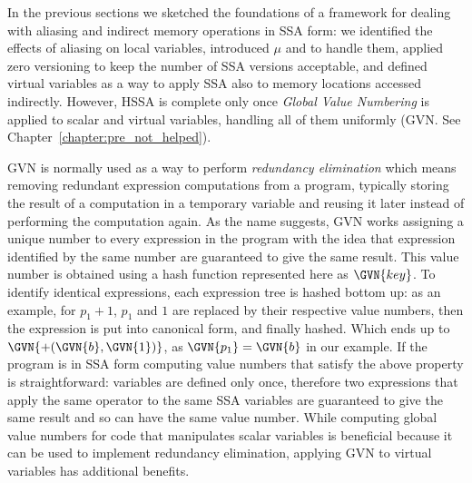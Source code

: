 In the previous sections we sketched the foundations of a framework for dealing with aliasing and indirect memory operations in SSA form: we identified the effects of aliasing on local variables, introduced $\mu$ and \chiops to handle them, applied zero versioning to keep the number of SSA versions acceptable, and defined virtual variables as a way to apply SSA also to memory locations accessed indirectly. However, HSSA is complete only once {\em Global Value Numbering} is applied to scalar and virtual variables, handling all of them uniformly (GVN. See Chapter~\ref{chapter:pre_not_helped}).

GVN is normally used as a way to perform \emph{redundancy elimination} which means removing redundant expression computations from a program, typically storing the result of a computation in a temporary variable and reusing it later instead of performing the computation again.
As the name suggests, GVN works assigning a unique number to every expression in the program with the idea that expression identified by the same number are guaranteed to give the same result.
This value number is obtained using a hash function represented here as $\GVN{key}$.
To identify identical expressions, each expression tree is hashed bottom up: as an example, for $p_1+1$, $p_1$ and $1$ are replaced by their respective value numbers, then the expression is put into canonical form, and finally hashed. Which ends up to $\GVN{+(\GVN{b},\GVN{1})}$, as $\GVN{p_1}=\GVN{b}$ in our example.
If the program is in SSA form computing value numbers that satisfy the above property is straightforward: variables are defined only once, therefore two expressions that apply the same operator to the same SSA variables are guaranteed to give the same result and so can have the same value number.
While computing global value numbers for code that manipulates scalar variables is beneficial because it can be used to implement redundancy elimination, applying GVN to virtual variables has additional benefits.

